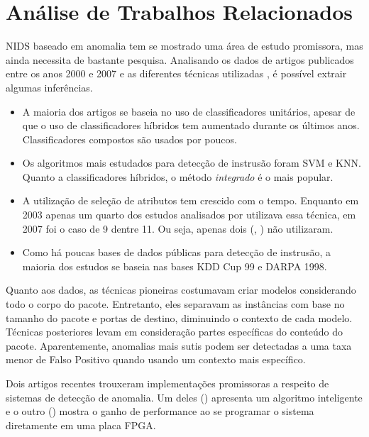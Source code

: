 \chapter{Análise de Trabalhos Relacionados}
\label{ch:analise}

NIDS baseado em anomalia tem se mostrado uma área de estudo promissora, mas ainda necessita de bastante pesquisa.
Analisando os dados de artigos publicados entre os anos 2000 e 2007 e as diferentes técnicas utilizadas \cite{tsai09},
é possível extrair algumas inferências.
\begin{itemize}
    \item  A maioria dos artigos se baseia no uso de classificadores unitários, apesar de que o uso de
    classificadores híbridos tem aumentado durante os últimos anos. Classificadores compostos são usados por poucos.

    \item Os algoritmos mais estudados para detecção de instrusão foram SVM e KNN. Quanto a classificadores híbridos,
    o método \textit{integrado} é o mais popular.

    \item A utilização de seleção de atributos tem crescido com o tempo. Enquanto em 2003 apenas um quarto dos estudos analisados
por \cite{tsai09} utilizava essa técnica, em 2007 foi o caso de 9 dentre 11. Ou seja, apenas dois
(\cite{peddabachigari07}, \cite{li07}) não utilizaram.

    \item Como há poucas bases de dados públicas para detecção de instrusão, a maioria dos estudos se baseia nas
    bases KDD Cup 99 e DARPA 1998.
\end{itemize}

\par Quanto aos dados, as técnicas pioneiras costumavam criar modelos considerando todo o corpo do pacote. Entretanto,
eles separavam as instâncias com base no tamanho do pacote e portas de destino, diminuindo o contexto de cada modelo.
Técnicas posteriores levam em consideração partes específicas do conteúdo do pacote. Aparentemente, anomalias mais
sutis podem ser detectadas a uma taxa menor de Falso Positivo quando usando um contexto mais específico.
\par Dois artigos recentes trouxeram implementações promissoras a respeito de sistemas de detecção de
anomalia. Um deles (\cite{lin12}) apresenta um algoritmo inteligente e o outro (\cite{papadonikolakis12}) mostra o
ganho de performance ao se programar o sistema diretamente em uma placa FPGA.


